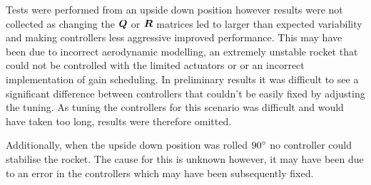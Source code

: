 Tests were performed from an upside down position however results were not collected as changing the $\bm Q$ or $\bm R$ matrices led to larger than expected variability and making controllers less aggressive improved performance. 
This may have been due to incorrect aerodynamic modelling, an extremely unstable rocket that could not be controlled with the limited actuators or or an incorrect implementation of gain scheduling.
In preliminary results it was difficult to see a significant difference between controllers that couldn't be easily fixed by adjusting the tuning. 
As tuning the controllers for this scenario was difficult and would have taken too long, results were therefore omitted.

Additionally, when the upside down position was rolled $90\degree$ no controller could stabilise the rocket. 
The cause for this is unknown however, it may have been due to an error in the controllers which may have been subsequently fixed.